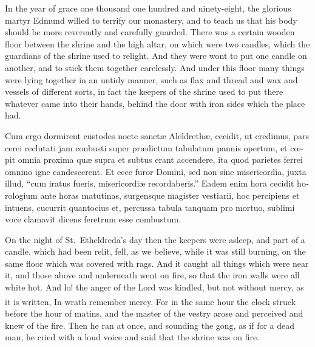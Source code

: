 \documentclass[10pt]{book}
\newcounter{engnote}
\newcommand{\engnotenum}{\textsuperscript{\arabic{engnote}\stepcounter{engnote}}}
\newcommand{\engnotetext}[1]{\vphantom{\footnotemark{}}\footnotetext{#1}}
\begin{document}
\begin{paracol}{2}
\begin{otherlanguage}{latin}
\end{otherlanguage}

\switchcolumn

In the year of grace one thousand one hundred and ninety-eight, the glorious martyr Edmund willed to terrify our monastery, and to teach us that his body should be more reverently and carefully guarded. There was a certain wooden floor between the shrine and the high altar, on which were two candles, which the guardians of the shrine used to relight. And they were wont to put one candle on another, and to stick them together carelessly. And under this floor many things were lying together in an untidy manner, such as flax and thread and wax and vessels of different sorts, in fact the keepers of the shrine used to put there whatever came into their hands, behind the door with iron sides which the place had.

\switchcolumn*

\begin{otherlanguage}{latin}
Cum ergo dormirent custodes nocte sanct\ae{} Aleldreth\ae{}, cecidit, ut credimus, pars cerei reclutati jam conbusti super pr\ae{}dictum tabulatum pannis opertum, et c\oe{}pit omnia proxima qu\ae{} supra et subtus erant accendere, ita quod parietes ferrei omnino igne candescerent. Et ecce furor Domini, sed non sine misericordia, juxta illud, ``cum iratus fueris, misericordi\ae{} recordaberis.''\engnotetext{Hab.\ iii., \oldstylenums{2}.} Eadem enim hora cecidit horologium ante horas matutinas, surgensque magister vestiarii, hoc percipiens et intuens, cucurrit quantocius et, percussa tabula tanquam pro mortuo, sublimi voce clamavit dicens feretrum esse combustum.
\end{otherlanguage}

\switchcolumn

On the night of St.\ Etheldreda's day then the keepers were asleep, and part of a candle, which had been relit, fell, as we believe, while it was still burning, on the same floor which was covered with rags. And it caught all things which were near it, and those above and underneath went on fire, so that the iron walls were all white hot. And lo! the anger of the Lord was kindled, but not without mercy, as it is written, In wrath remember mercy.\engnotenum{} For in the same hour the clock struck before the hour of matins, and the master of the vestry arose and perceived and knew of the fire. Then he ran at once, and sounding the gong, as if for a dead man, he cried with a loud voice and said that the shrine was on fire.


\end{paracol}
\end{document}
